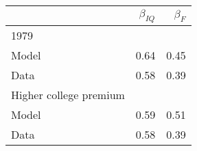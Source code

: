 \begin{tabular}{lrr}
\hline
  & $\beta_{IQ}$  & $\beta_{F}$  \\ 
\hline
1979 &   &   \\ 
Model & 0.64  & 0.45  \\ 
Data & 0.58  & 0.39  \\ 
Higher college premium &   &   \\ 
Model & 0.59  & 0.51  \\ 
Data & 0.58  & 0.39  \\ 
\hline
\end{tabular}%
